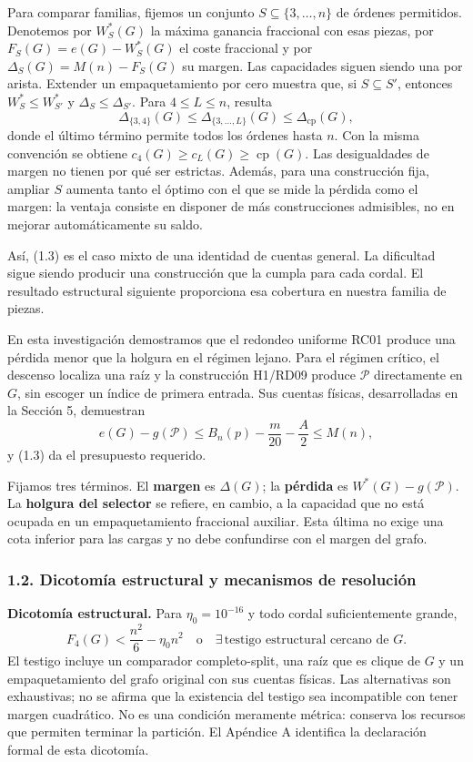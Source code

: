 \documentclass[spanish,11pt,a4paper]{article}
\begin{document}
Para comparar familias, fijemos un conjunto \(S\subseteq\{3,\ldots,n\}\) de órdenes permitidos. Denotemos por \(W_S^*(G)\) la máxima ganancia fraccional con esas piezas, por \(F_S(G)=e(G)-W_S^*(G)\) el coste fraccional y por \(\Delta_S(G)=M(n)-F_S(G)\) su margen. Las capacidades siguen siendo una por arista. Extender un empaquetamiento por cero muestra que, si \(S\subseteq S'\), entonces \(W_S^*\le W_{S'}^*\) y \(\Delta_S\le\Delta_{S'}\). Para \(4\le L\le n\), resulta \[
\Delta_{\{3,4\}}(G)\le\Delta_{\{3,\ldots,L\}}(G)
\le\Delta_{\mathrm{cp}}(G),
\tag{1.3b}
\] donde el último término permite todos los órdenes hasta \(n\). Con la misma convención se obtiene \(c_4(G)\ge c_L(G)\ge\operatorname{cp}(G)\). Las desigualdades de margen no tienen por qué ser estrictas. Además, para una construcción fija, ampliar \(S\) aumenta tanto el óptimo con el que se mide la pérdida como el margen: la ventaja consiste en disponer de más construcciones admisibles, no en mejorar automáticamente su saldo.

Así, (1.3) es el caso mixto de una identidad de cuentas general. La dificultad sigue siendo producir una construcción que la cumpla para cada cordal. El resultado estructural siguiente proporciona esa cobertura en nuestra familia de piezas.

En esta investigación demostramos que el redondeo uniforme RC01 produce una pérdida menor que la holgura en el régimen lejano. Para el régimen crítico, el descenso localiza una raíz y la construcción H1/RD09 produce \(\mathcal P\) directamente en \(G\), sin escoger un índice de primera entrada. Sus cuentas físicas, desarrolladas en la Sección 5, demuestran \[
e(G)-g(\mathcal P)
\le B_n(p)-\frac m{20}-\frac A2
\le M(n),
\tag{1.4}
\] y (1.3) da el presupuesto requerido.

Fijamos tres términos. El \textbf{margen} es \(\Delta(G)\); la \textbf{pérdida} es \(W^*(G)-g(\mathcal P)\). La \textbf{holgura del selector} se refiere, en cambio, a la capacidad que no está ocupada en un empaquetamiento fraccional auxiliar. Esta última no exige una cota inferior para las cargas y no debe confundirse con el margen del grafo.

\subsubsection{1.2. Dicotomía estructural y mecanismos de resolución}\label{dicotomia-estructural-y-mecanismos-de-resolucion}

\textbf{Dicotomía estructural.} Para \(\eta_0=10^{-16}\) y todo cordal suficientemente grande, \[
\boxed{
F_4(G)<\frac{n^2}{6}-\eta_0n^2
\quad\text{o}\quad
\exists\,\text{testigo estructural cercano de }G.
}
\tag{1.5}
\] El testigo incluye un comparador completo-split, una raíz que es clique de \(G\) y un empaquetamiento del grafo original con sus cuentas físicas. Las alternativas son exhaustivas; no se afirma que la existencia del testigo sea incompatible con tener margen cuadrático. No es una condición meramente métrica: conserva los recursos que permiten terminar la partición. El Apéndice A identifica la declaración formal de esta dicotomía.
\end{document}
